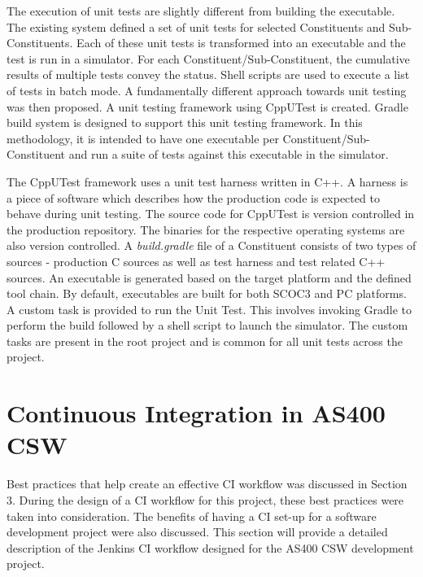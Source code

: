\documentclass[12pt, a4paper, titlepage]{scrartcl}
\newcommand{\courierword}[1]{\textsf{\itshape #1}}{\fontfamily{pcr}\selectfont}%
\begin{document}
\par The execution of unit tests are slightly different from building the executable. The existing system defined a set of unit tests for selected Constituents and Sub-Constituents. Each of these unit tests is transformed into an executable and the test is run in a simulator. For each Constituent/Sub-Constituent, the cumulative results of multiple tests convey the status. Shell scripts are used to execute a list of tests in batch mode. A fundamentally different approach towards unit testing was then proposed. A unit testing framework using CppUTest is created. Gradle build system is designed to support this unit testing framework. In this methodology, it is intended to have one executable per Constituent/Sub-Constituent and run a suite of tests against this executable in the simulator. 
\par The CppUTest framework uses a unit test harness written in C++. A harness is a piece of software which describes how the production code is expected to behave during unit testing. The source code for CppUTest is version controlled in the production repository. The binaries for the respective operating systems are also version controlled. A \courierword{build.gradle} file of a Constituent consists of two types of sources - production C sources as well as test harness and test related C++ sources. An executable is generated based on the target platform and the defined tool chain. By default, executables are built for both SCOC3 and PC platforms. A custom task is provided to run the Unit Test. This involves invoking Gradle to perform the build followed by a shell script to launch the simulator. The custom tasks are present in the root project and is common for all unit tests across the project. 
\pagebreak
\section{Continuous Integration in AS400 CSW}
\par Best practices that help create an effective CI workflow was discussed in Section 3. During the design of a CI workflow for this project, these best practices were taken into consideration. The benefits of having a CI set-up for a software development project were also discussed. This section will provide a detailed description of the Jenkins CI workflow designed for the AS400 CSW development project. 
\end{document}
